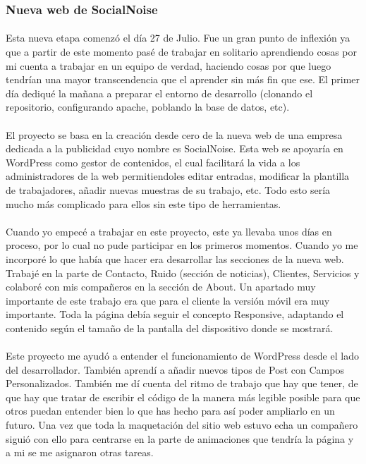 \documentclass[11pt, a4paper,spanish]{article}
\begin{document}
            \subsubsection{Nueva web de SocialNoise}

                \paragraph{}
                Esta nueva etapa comenzó el día 27 de Julio. Fue un gran punto de inflexión ya que a partir de este momento pasé de trabajar en solitario aprendiendo cosas por mi cuenta a trabajar en un equipo de verdad, haciendo cosas por que luego tendrían una mayor transcendencia que el aprender sin más fin que ese. El primer día dediqué la mañana a preparar el entorno de desarrollo (clonando el repositorio, configurando apache, poblando la base de datos, etc).

                \paragraph{}
                El proyecto se basa en la creación desde cero de la nueva web de una empresa dedicada a la publicidad cuyo nombre es SocialNoise. Esta web se apoyaría en WordPress como gestor de contenidos, el cual facilitará la vida a los administradores de la web permitiendoles editar entradas, modificar la plantilla de trabajadores, añadir nuevas muestras de su trabajo, etc. Todo esto sería mucho más complicado para ellos sin este tipo de herramientas.

                \paragraph{}
                Cuando yo empecé a trabajar en este proyecto, este ya llevaba unos días en proceso, por lo cual no pude participar en los primeros momentos. Cuando yo me incorporé lo que había que hacer era desarrollar las  secciones de la nueva web. Trabajé en la parte de Contacto, Ruido (sección de noticias), Clientes, Servicios y colaboré con mis compañeros en  la sección de About. Un apartado muy importante de este trabajo era que para el cliente la versión móvil era muy importante. Toda la página debía seguir el concepto Responsive, adaptando el contenido según el tamaño de la pantalla del dispositivo donde se mostrará.

                \paragraph{}
                Este proyecto me ayudó a entender el funcionamiento de WordPress desde el lado del desarrollador. También aprendí a añadir nuevos tipos de Post con Campos Personalizados. También me dí cuenta del ritmo de trabajo que hay que tener, de que hay que tratar de escribir el código de la manera más legible posible para que otros puedan entender bien lo que has hecho para así poder ampliarlo en un futuro. Una vez que toda la maquetación del sitio web estuvo echa un compañero siguió con ello para centrarse en la parte de animaciones que tendría la página y a mi se me asignaron otras tareas.
\end{document}
